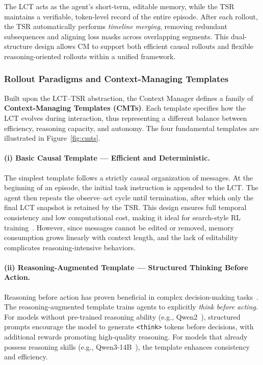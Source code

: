 The LCT acts as the agent’s short-term, editable memory, while the TSR maintains a verifiable, token-level record of the entire episode. 
After each rollout, the TSR automatically performs \emph{timeline merging}, removing redundant subsequences and aligning loss masks across overlapping segments. 
This dual-structure design allows CM to support both efficient causal rollouts and flexible reasoning-oriented rollouts within a unified framework.

\subsubsection{Rollout Paradigms and Context-Managing Templates}
\label{sec:cmt}

Built upon the LCT–TSR abstraction, the Context Manager defines a family of \textbf{Context-Managing Templates (CMTs)}. 
Each template specifies how the LCT evolves during interaction, thus representing a different balance between efficiency, reasoning capacity, and autonomy. 
The four fundamental templates are illustrated in Figure~\ref{fig:cmts}.

\paragraph{(i) Basic Causal Template — Efficient and Deterministic.}
The simplest template follows a strictly causal organization of messages. 
At the beginning of an episode, the initial task instruction is appended to the LCT. 
The agent then repeats the observe–act cycle until termination, after which only the final LCT snapshot is retained by the TSR.
This design ensures full temporal consistency and low computational cost, making it ideal for search-style RL training~\citep{jin2025search}. 
However, since messages cannot be edited or removed, memory consumption grows linearly with context length, and the lack of editability complicates reasoning-intensive behaviors.

\paragraph{(ii) Reasoning-Augmented Template — Structured Thinking Before Action.}
Reasoning before action has proven beneficial in complex decision-making tasks~\citep{guo2025deepseek}. 
The reasoning-augmented template trains agents to explicitly \emph{think before acting}. 
For models without pre-trained reasoning ability (e.g., Qwen2~\citep{team2024qwen2}), structured prompts encourage the model to generate \texttt{<think>} tokens before decisions, with additional rewards promoting high-quality reasoning. 
For models that already possess reasoning skills (e.g., Qwen3-14B~\citep{qwen2025technical}), the template enhances consistency and efficiency. 

